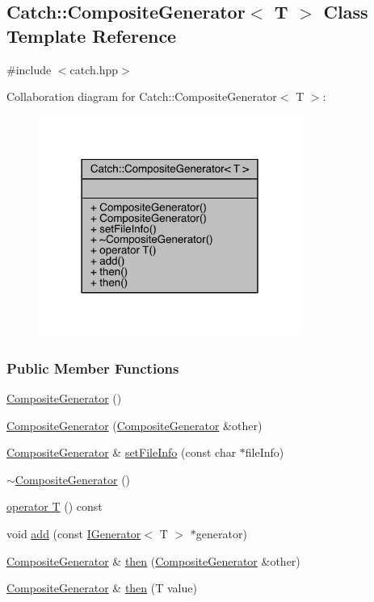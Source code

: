 \hypertarget{a00012}{}\subsection{Catch\+:\+:Composite\+Generator$<$ T $>$ Class Template Reference}
\label{a00012}


{\ttfamily \#include $<$catch.\+hpp$>$}



Collaboration diagram for Catch\+:\+:Composite\+Generator$<$ T $>$\+:\nopagebreak
\begin{figure}[H]
\begin{center}
\leavevmode
\includegraphics[width=243pt]{a00181}
\end{center}
\end{figure}
\subsubsection*{Public Member Functions}
\begin{DoxyCompactItemize}
\item 
\hyperlink{a00012_a923398b140371d1783858766864a1af5}{Composite\+Generator} ()
\item 
\hyperlink{a00012_a21a7070a00e4a6fe021294c356692692}{Composite\+Generator} (\hyperlink{a00012}{Composite\+Generator} \&other)
\item 
\hyperlink{a00012}{Composite\+Generator} \& \hyperlink{a00012_ac3c57cf4ca5472f440bf71e2936bcd4a}{set\+File\+Info} (const char $\ast$file\+Info)
\item 
\hyperlink{a00012_a5766205abd7004c508c20ddbb5e5555e}{$\sim$\+Composite\+Generator} ()
\item 
\hyperlink{a00012_aa3f627d84fb256df0404d19d7fd4b784}{operator T} () const 
\item 
void \hyperlink{a00012_af3774d42ad2d3453d089ca599efe0517}{add} (const \hyperlink{a00034}{I\+Generator}$<$ T $>$ $\ast$generator)
\item 
\hyperlink{a00012}{Composite\+Generator} \& \hyperlink{a00012_a2e03f42df85cdd238aabd77a80b075d5}{then} (\hyperlink{a00012}{Composite\+Generator} \&other)
\item 
\hyperlink{a00012}{Composite\+Generator} \& \hyperlink{a00012_aefdc11bcfccdf07d2db5f0da3ed8758c}{then} (T value)
\end{DoxyCompactItemize}


